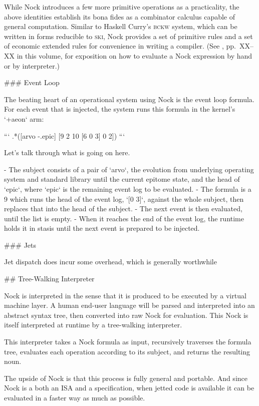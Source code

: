 \documentclass[twoside]{article}
\begin{document}
\noindent
While Nock introduces a few more primitive operations as a practicality, the above identities establish its bona fides as a combinator calculus capable of general computation.  Similar to Haskell Curry's \textsc{bckw} system, which can be written in forms reducible to \textsc{ski}, Nock provides a set of primitive rules and a set of economic extended rules for convenience in writing a compiler.  (See \citet{Galebach2025}, pp.~XX–XX in this volume, for exposition on how to evaluate a Nock expression by hand or by interpreter.)





### Event Loop

The beating heart of an operational system using Nock is the event loop formula.  For each event that is injected, the system runs this formula in the kernel's `+aeon` arm:

```
.*([arvo -.epic] [9 2 10 [6 0 3] 0 2])
```

Let's talk through what is going on here.

- The subject consists of a pair of `arvo`, the evolution from underlying operating system and standard library until the current epitome state, and the head of `epic`, where `epic` is the remaining event log to be evaluated.
- The formula is a 9 which runs the head of the event log, `[0 3]`, against the whole subject, then replaces that into the head of the subject.
- The next event is then evaluated, until the list is empty.
- When it reaches the end of the event log, the runtime holds it in stasis until the next event is prepared to be injected.


### Jets


Jet dispatch does incur some overhead, which is generally worthwhile

## Tree-Walking Interpreter

Nock is interpreted in the sense that it is produced to be executed by a virtual machine layer.  A human end-user language will be parsed and interpreted into an abstract syntax tree, then converted into raw Nock for evaluation.  This Nock is itself interpreted at runtime by a tree-walking interpreter.

This interpreter takes a Nock formula as input, recursively traverses the formula tree, evaluates each operation according to its subject, and returns the resulting noun.

The upside of Nock is that this process is fully general and portable.  And since Nock is a both an ISA and a specification, when jetted code is available it can be evaluated in a faster way as much as possible.
\end{document}
